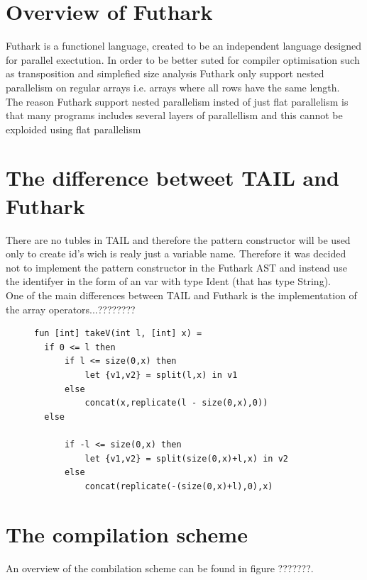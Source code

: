 \documentclass[11pt]{article}
\begin{document}
\section{Overview of Futhark}
Futhark is a functionel language, created to be an independent language designed for parallel exectution. In order to be better suted for compiler optimisation such as transposition and simplefied size analysis Futhark only support nested parallelism on regular arrays i.e. arrays where all rows have the same length.\\

The reason Futhark support nested parallelism insted of just flat parallelism is that many programs includes several layers of parallellism and this cannot be exploided using flat parallelism %



\section{The difference betweet TAIL and Futhark}
There are no tubles in TAIL and therefore the pattern constructor will be used only to create id's wich is realy just a variable name. Therefore it was decided not to implement the pattern constructor in the Futhark AST and instead use the identifyer in the form of an var with type Ident (that has type String). \\

One of the main differences between TAIL and Futhark is the implementation of the array operators...???????? \\
\begin{figure}
\begin{lstlisting}
fun [int] takeV(int l, [int] x) =
  if 0 <= l then
      if l <= size(0,x) then
          let {v1,v2} = split(l,x) in v1
      else
          concat(x,replicate(l - size(0,x),0))
  else
  
      if -l <= size(0,x) then
          let {v1,v2} = split(size(0,x)+l,x) in v2
      else
          concat(replicate(-(size(0,x)+l),0),x)
\end{lstlisting}
\end{figure}
\section{The compilation scheme}
An overview of the combilation scheme can be found in figure ???????. 
\end{document}
